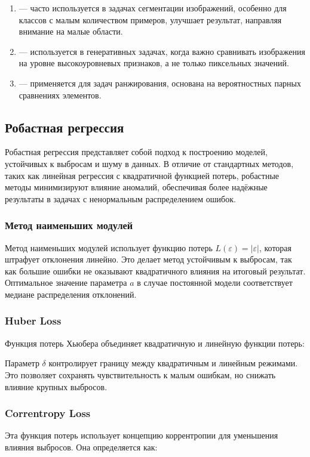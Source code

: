 \begin{enumerate}
    \item {} — часто используется в задачах сегментации изображений, особенно для классов с малым количеством примеров, улучшает результат, направляя внимание на малые области.
    
    \item {} — используется в генеративных задачах, когда важно сравнивать изображения на уровне высокоуровневых признаков, а не только пиксельных значений.
    
    \item {} — применяется для задач ранжирования, основана на вероятностных парных сравнениях элементов.
\end{enumerate}


\subsection*{Робастная регрессия}
Робастная регрессия представляет собой подход к построению моделей, устойчивых к выбросам и шуму в данных. В отличие от стандартных методов, таких как линейная регрессия с квадратичной функцией потерь, робастные методы минимизируют влияние аномалий, обеспечивая более надёжные результаты в задачах с ненормальным распределением ошибок.

\subsubsection*{Метод наименьших модулей}
Метод наименьших модулей использует функцию потерь $L(\varepsilon) = |\varepsilon|$, которая штрафует отклонения линейно. Это делает метод устойчивым к выбросам, так как большие ошибки не оказывают квадратичного влияния на итоговый результат. Оптимальное значение параметра $a$ в случае постоянной модели соответствует медиане распределения отклонений.

\subsubsection*{Huber Loss}
Функция потерь Хьюбера объединяет квадратичную и линейную функции потерь:

Параметр $\delta$ контролирует границу между квадратичным и линейным режимами. Это позволяет сохранять чувствительность к малым ошибкам, но снижать влияние крупных выбросов.

\subsubsection*{Correntropy Loss}
Эта функция потерь использует концепцию коррентропии для уменьшения влияния выбросов. Она определяется как:

